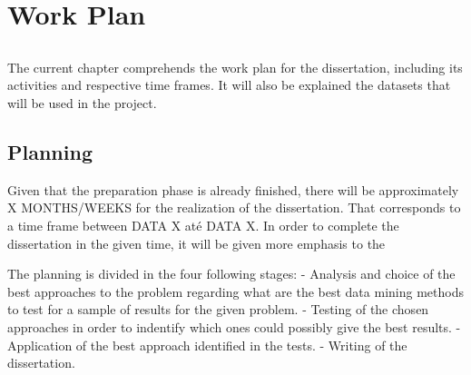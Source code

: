\chapter{Work Plan}\label{chap:chap3}

\section*{}

The current chapter comprehends the work plan for the dissertation, including its activities and respective time frames. It will also be explained the datasets that will be used in the project.

\section{Planning}

Given that the preparation phase is already finished, there will be approximately X MONTHS/WEEKS for the realization of the dissertation. That corresponds to a time frame between DATA X até DATA X. In order to complete the dissertation in the given time, it will be given more emphasis to the 

The planning is divided in the four following stages:
- Analysis and choice of the best approaches to the problem regarding what are the best data mining methods to test for a sample of results for the given problem.
- Testing of the chosen approaches in order to indentify which ones could possibly give the best results.
- Application of the best approach identified in the tests.
- Writing of the dissertation.

